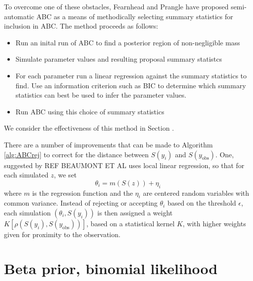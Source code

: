 \documentclass[a4paper,10pt]{article}
\begin{document}
To overcome one of these obstacles, Fearnhead and Prangle \cite{Fearnhead2012} have proposed semi-automatic ABC as a means of methodically selecting summary statistics for inclusion in ABC. The method proceeds as follows:

\begin{itemize}
\item Run an inital run of ABC to find a posterior region of non-negligible mass
\item Simulate parameter values and resulting proposal summary statistcs
\item For each parameter run a linear regression against the summary statistics to find. Use an information criterion such as BIC to determine which summary statistics can best be used to infer the parameter values.
\item Run ABC using this choice of summary statistics
\end{itemize}

We consider the effectiveness of this method in Section \cite{sec:saabc}.

There are a number of improvements that can be made to Algorithm \ref{alg:ABCrej} to correct for the distance between $S(y_i)$ and $S(y_\textrm{obs})$. One, suggested by REF BEAUMONT ET AL uses local linear regression, so that for each simulated $z$, we set 
\[
\theta_i = m(S(z)) + \eta_i
\]
where $m$ is the regression function and the $\eta_i$ are centered random variables with common variance. Instead of rejecting or accepting $\theta_i$ based on the threshold $\epsilon$, each simulation $(\theta_i, S(y_i))$ is then assigned a weight $K[\rho(S(y_i), S(y_\textrm{obs}))]$, based on a statistical kernel $K$, with higher weights given for proximity to the observation. 

\section{Beta prior, binomial likelihood} \label{sec:beta-bin}
\end{document}
